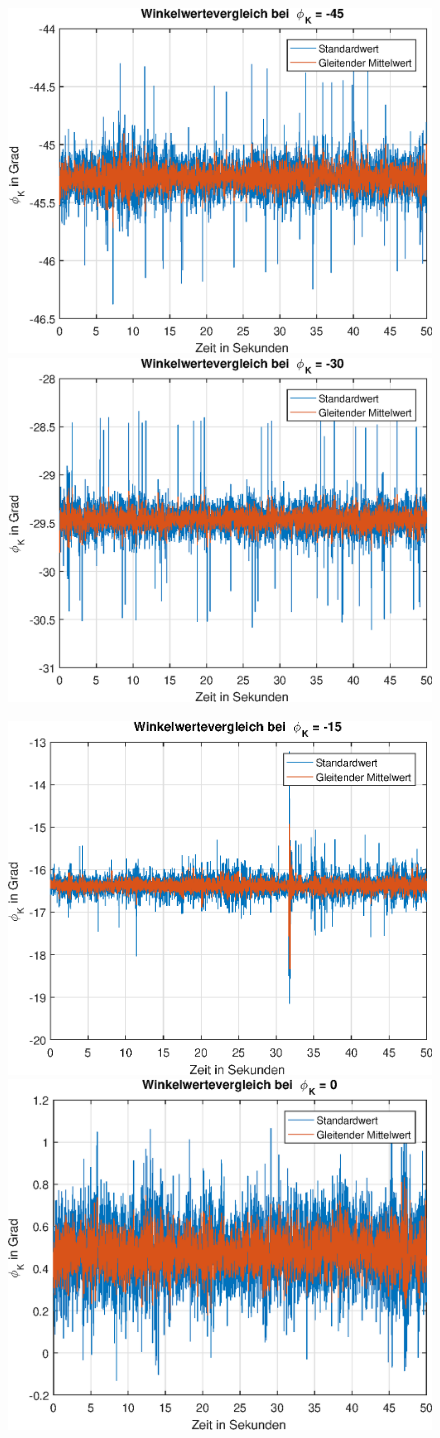\documentclass{article}
\begin{document}
\begin{figure}[h]
	\includegraphics[width=0.5\linewidth]{img/phiKm45_floatingMean_degree.eps}
	\includegraphics[width=0.5\linewidth]{img/phiKm30_floatingMean_degree.eps}
\end{figure}
\begin{figure}[h]
	\includegraphics[width=0.5\linewidth]{img/phiKm15_floatingMean_degree.eps}
	\includegraphics[width=0.5\linewidth]{img/phiK0_floatingMean_degree.eps}
\end{figure}
\end{document}
